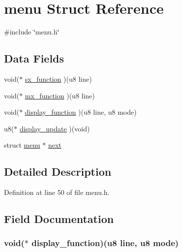 \hypertarget{structmenu}{\section{menu \-Struct \-Reference}
\label{structmenu}
}


{\ttfamily \#include \char`\"{}menu.\-h\char`\"{}}

\subsection*{\-Data \-Fields}
\begin{DoxyCompactItemize}
\item 
void($\ast$ \hyperlink{structmenu_ab821fa0d7f541480110bc8a674b42c79}{sx\-\_\-function} )(u8 line)
\item 
void($\ast$ \hyperlink{structmenu_a5e810089609d71c50a4fafb16304fc44}{mx\-\_\-function} )(u8 line)
\item 
void($\ast$ \hyperlink{structmenu_ae8f9b779300c82730bcfbd833f13bf9d}{display\-\_\-function} )(u8 line, u8 mode)
\item 
u8($\ast$ \hyperlink{structmenu_ab8460526701ec3ad0a231a398a963882}{display\-\_\-update} )(void)
\item 
struct \hyperlink{structmenu}{menu} $\ast$ \hyperlink{structmenu_aa35c173e9c9b7cab0ea757bbfd988893}{next}
\end{DoxyCompactItemize}


\subsection{\-Detailed \-Description}


\-Definition at line 50 of file menu.\-h.



\subsection{\-Field \-Documentation}
\hypertarget{structmenu_ae8f9b779300c82730bcfbd833f13bf9d}{
\subsubsection[{display\-\_\-function}]{\setlength{\rightskip}{0pt plus 5cm}void($\ast$ {\bf display\-\_\-function})(u8 line, u8 mode)}}\label{structmenu_ae8f9b779300c82730bcfbd833f13bf9d}


